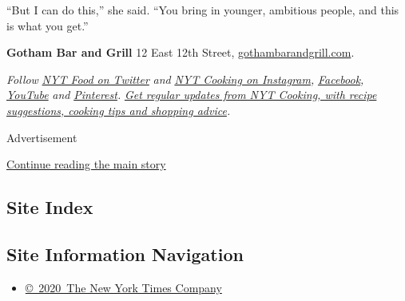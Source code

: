 ``But I can do this,'' she said. ``You bring in younger, ambitious
people, and this is what you get.''

\textbf{Gotham Bar and Grill} 12 East 12th Street,
\href{https://www.gothambarandgrill.com/}{gothambarandgrill.com}.

\emph{Follow} \href{https://twitter.com/nytfood}{\emph{NYT Food on
Twitter}} \emph{and}
\href{https://www.instagram.com/nytcooking/}{\emph{NYT Cooking on
Instagram}}\emph{,}
\href{https://www.facebookcorewwwi.onion/nytcooking/}{\emph{Facebook}}\emph{,}
\href{https://www.youtube.com/nytcooking}{\emph{YouTube}} \emph{and}
\href{https://www.pinterest.com/nytcooking/}{\emph{Pinterest}}\emph{.}
\href{https://www.nytimes3xbfgragh.onion/newsletters/cooking}{\emph{Get
regular updates from NYT Cooking, with recipe suggestions, cooking tips
and shopping advice}}\emph{.}

Advertisement

\protect\hyperlink{after-bottom}{Continue reading the main story}

\hypertarget{site-index}{%
\subsection{Site Index}\label{site-index}}

\hypertarget{site-information-navigation}{%
\subsection{Site Information
Navigation}\label{site-information-navigation}}

\begin{itemize}
\tightlist
\item
  \href{https://help.nytimes3xbfgragh.onion/hc/en-us/articles/115014792127-Copyright-notice}{©~2020~The
  New York Times Company}
\end{itemize}

